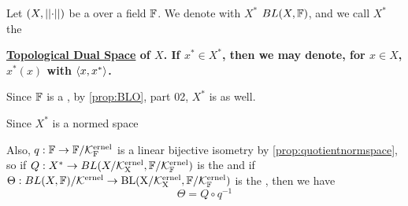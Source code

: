 \label{def:topologicaldualspace}
\newcommand{\SemiTopDualSpace}[0]{
    \bf \hyperref[def:topologicaldualspace]{Topological Dual Space} \rm
}
\begin{df}
    Let $(X,\left|\left| \cdot \right|\right|)$ be a 
    \SeminormedSpace
    over a field $\mathbb{F}$. 
    We denote with $X^*$ 
    \NormedSpace $BL(X,\mathbb{F})$, 
    and we call $X^*$ the
    \SemiTopDualSpace of $X$. 
    If $x^* \in X^*$, then we may denote, 
    for $x \in X$, 
    $x^*(x)$
    with 
    $\left\langle x,x^* \right\rangle$. 


    
    Since $\mathbb{F}$ is a \NormedSpace, 
    by \ref{prop:BLO}, 
    part 02, $X^*$ is as well. 

    Since $X^*$ is a normed space 

    Also, $q:\mathbb{F} \to \mathbb{F}/\bf\mathcal{K}\rm^{ernel}_F$ 
    is a linear bijective isometry by 
    \ref{prop:quotientnormspace}, so
    if $Q:X^* \to BL(X/\bf\mathcal{K}\rm^{ernel}_X, \mathbb{F}/\bf\mathcal{K}\rm^{ernel}_{\mathbb{F}})$ is the \OperatorQuotientMap
    and if $\Theta:BL(X,\mathbb{F})/\bf\mathcal{K}\rm^{ernel} \to BL(X/\bf\mathcal{K}\rm^{ernel}_X, \mathbb{F}/\bf\mathcal{K}\rm^{ernel}_{\mathbb{F}})$ 
    is the \CanonicalIso, then we have 
    \begin{equation}
    \Theta=Q \circ q^{-1}
    \end{equation}


\end{df}

